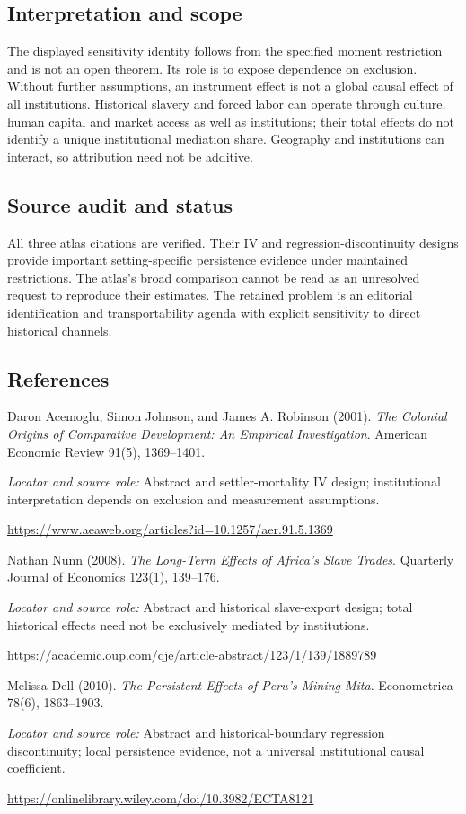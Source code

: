 \documentclass[11pt,a4paper]{article}
\begin{document}
\subsection*{Interpretation and scope}
The displayed sensitivity identity follows from the specified moment restriction and is not an open theorem. Its role is to expose dependence on exclusion. Without further assumptions, an instrument effect is not a global causal effect of all institutions. Historical slavery and forced labor can operate through culture, human capital and market access as well as institutions; their total effects do not identify a unique institutional mediation share. Geography and institutions can interact, so attribution need not be additive.
\subsection*{Source audit and status}
All three atlas citations are verified. Their IV and regression-discontinuity designs provide important setting-specific persistence evidence under maintained restrictions. The atlas's broad comparison cannot be read as an unresolved request to reproduce their estimates. The retained problem is an editorial identification and transportability agenda with explicit sensitivity to direct historical channels.
\subsection*{References}
{\footnotesize\raggedright
\begin{enumerate}[label={\textbf{[S\arabic*]}},leftmargin=3em]
\item Daron Acemoglu, Simon Johnson, and James A. Robinson (2001). \emph{The Colonial Origins of Comparative Development: An Empirical Investigation}. American Economic Review 91(5), 1369--1401.\par
\textit{Locator and source role:} Abstract and settler-mortality IV design; institutional interpretation depends on exclusion and measurement assumptions.\par
\url{https://www.aeaweb.org/articles?id=10.1257/aer.91.5.1369}
\item Nathan Nunn (2008). \emph{The Long-Term Effects of Africa's Slave Trades}. Quarterly Journal of Economics 123(1), 139--176.\par
\textit{Locator and source role:} Abstract and historical slave-export design; total historical effects need not be exclusively mediated by institutions.\par
\url{https://academic.oup.com/qje/article-abstract/123/1/139/1889789}
\item Melissa Dell (2010). \emph{The Persistent Effects of Peru's Mining Mita}. Econometrica 78(6), 1863--1903.\par
\textit{Locator and source role:} Abstract and historical-boundary regression discontinuity; local persistence evidence, not a universal institutional causal coefficient.\par
\url{https://onlinelibrary.wiley.com/doi/10.3982/ECTA8121}
\end{enumerate}
}
\end{document}
